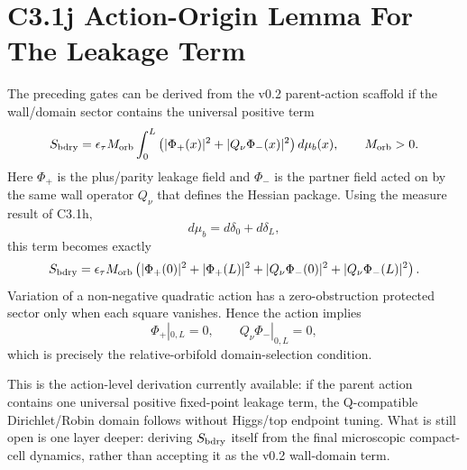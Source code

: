 \documentclass[11pt]{article}
\begin{document}
\section{C3.1j Action-Origin Lemma For The Leakage Term}
The preceding gates can be derived from the v0.2 parent-action scaffold if the
wall/domain sector contains the universal positive term
\begin{equation}
S_{\rm bdry}=
\epsilon_\tau M_{\rm orb}
\int_0^L
\left(|\Phi_+(x)|^2+|Q_\nu\Phi_-(x)|^2\right)
d\mu_b(x),
\qquad
M_{\rm orb}>0 .
\end{equation}
Here $\Phi_+$ is the plus/parity leakage field and $\Phi_-$ is the partner field
acted on by the same wall operator $Q_\nu$ that defines the Hessian package.
Using the measure result of C3.1h,
\begin{equation}
d\mu_b=d\delta_0+d\delta_L,
\end{equation}
this term becomes exactly
\begin{equation}
S_{\rm bdry}
=\epsilon_\tau M_{\rm orb}
\left(
|\Phi_+(0)|^2+|\Phi_+(L)|^2
+|Q_\nu\Phi_-(0)|^2+|Q_\nu\Phi_-(L)|^2
\right).
\end{equation}
Variation of a non-negative quadratic action has a zero-obstruction protected
sector only when each square vanishes.  Hence the action implies
\begin{equation}
\Phi_+|_{0,L}=0,
\qquad
Q_\nu\Phi_-|_{0,L}=0,
\end{equation}
which is precisely the relative-orbifold domain-selection condition.

This is the action-level derivation currently available: if the parent action
contains one universal positive fixed-point leakage term, the Q-compatible
Dirichlet/Robin domain follows without Higgs/top endpoint tuning.  What is
still open is one layer deeper: deriving $S_{\rm bdry}$ itself from the final
microscopic compact-cell dynamics, rather than accepting it as the v0.2
wall-domain term.
\end{document}
